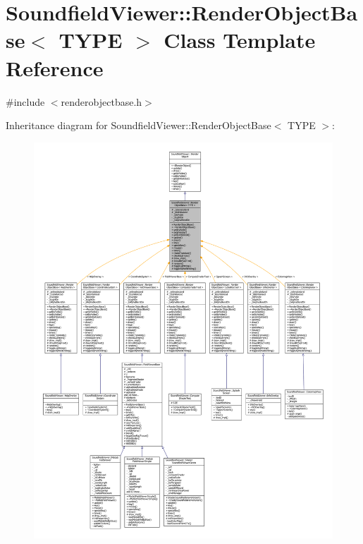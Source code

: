 \section{Soundfield\-Viewer\-:\-:Render\-Object\-Base$<$ T\-Y\-P\-E $>$ Class Template Reference}
\label{classSoundfieldViewer_1_1RenderObjectBase}


{\ttfamily \#include $<$renderobjectbase.\-h$>$}



Inheritance diagram for Soundfield\-Viewer\-:\-:Render\-Object\-Base$<$ T\-Y\-P\-E $>$\-:\nopagebreak
\begin{figure}[H]
\begin{center}
\leavevmode
\includegraphics[width=350pt]{d8/db8/classSoundfieldViewer_1_1RenderObjectBase__inherit__graph}
\end{center}
\end{figure}



